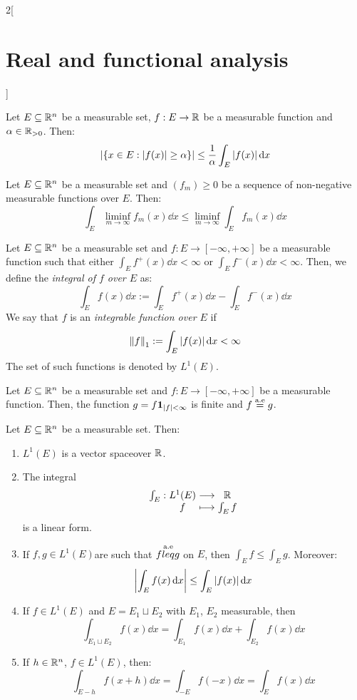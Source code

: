 \documentclass[../../../main_math.tex]{subfiles}
\begin{document}
\begin{multicols}{2}[\section{Real and functional analysis}]
\begin{theorem}
    Let $E\subseteq\mathbb{R}^n$ be a measurable set, $f:E\rightarrow\mathbb{R}$ be a measurable function and $\alpha\in\mathbb{R}_{>0}$. Then: $$\abs{\{x\in E:\abs{f(x)}\geq\alpha\}}\leq\frac{1}{\alpha}\int_E \abs{f(x)}\dd{x}$$
  \end{theorem}
  \begin{lemma}
    Let $E\subseteq\mathbb{R}^n$ be a measurable set and $(f_m)\geq 0$ be a sequence of non-negative measurable functions over $E$. Then: $$\int_E\liminf_{m\to\infty}f_m(x)\dd{x}\leq \liminf_{m\to\infty}\int_Ef_m(x)\dd{x}$$
  \end{lemma}
  \begin{definition}
    Let $E\subseteq\mathbb{R}^n$ be a measurable set and $f:E\rightarrow[-\infty,+\infty]$ be a measurable function such that either $\int_Ef^+(x)\dd{x}<\infty$ or $\int_Ef^-(x)\dd{x}<\infty$. Then, we define the \emph{integral of $f$ over $E$} as: $$\int_Ef(x)\dd{x}:=\int_Ef^+(x)\dd{x}-\int_Ef^-(x)\dd{x}$$
    We say that $f$ is an \emph{integrable function over $E$} if $${\left\|f\right\|}_1:=\int_E\abs{f(x)}\dd{x}<\infty$$ The set of such functions is denoted by $ L^1(E)$.
  \end{definition}
  \begin{proposition}
    Let $E\subseteq\mathbb{R}^n$ be a measurable set and $f:E\rightarrow[-\infty,+\infty]$ be a measurable function. Then, the function $g=f\boldsymbol{\mathrm{1}}_{\abs{f}<\infty}$ is finite and $f\overset{\text{a.e}}{=}g$.
  \end{proposition}
  \begin{proposition}
    Let $E\subseteq\mathbb{R}^n$ be a measurable set. Then:
    \begin{enumerate}
      \item $ L^1(E)$ is a vector spaceover $\mathbb{R}$.
      \item The integral $$\function{\int_E}{ L^1(E)}{\RR}{f}{\int_Ef}$$ is a linear form.
      \item If $f,g\in L^1(E)$are such that $f\overset{\text{a.e}}{leq} g$ on $E$, then $\int_E f\leq\int_E g$. Moreover: $$\abs{\int_Ef(x)\dd{x}}\leq \int_E\abs{f(x)}\dd{x}$$
      \item If $f\in L^1(E)$ and $E=E_1\sqcup E_2$ with $E_1$, $E_2$ measurable, then $$\int_{E_1\sqcup E_2}f(x)\dd{x}=\int_{E_1}f(x)\dd{x}+\int_{E_2}f(x)\dd{x}$$
      \item If $h\in\mathbb{R}^n$, $f\in L^1(E)$, then: $$\int_{E-h}f(x+h)\dd{x}=\int_{-E}f(-x)\dd{x}=\int_{E}f(x)\dd{x}$$
    \end{enumerate}
  \end{proposition}
  \begin{theorem}

\end{theorem}
\end{multicols}
\end{document}
